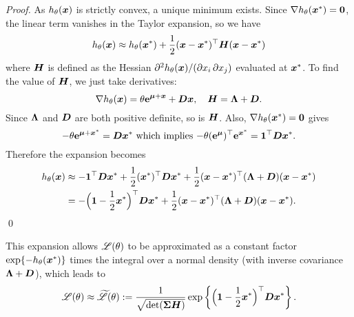 \begin{proof}
As $h_\theta(\bm{x})$ is strictly convex, a unique minimum exists. Since $\nabla
h_\theta(\bm{x}^*) = \bm{0}$, the linear term vanishes in the Taylor expansion,
so we have
%
\[ h_\theta(\bm{x}) \approx h_\theta(\bm{x}^*)
  + \frac12 (\bm{x} - \bm{x}^*)^\top \bm{H} (\bm{x} - \bm{x}^*) \]
%
where $\bm{H}$ is defined as the Hessian $\partial^2 h_\theta(\bm{x}) / ( \partial
x_i \, \partial x_j )$ evaluated at $\bm{x}^*$.  To find the value of $\bm{H}$, we
just take derivatives:
%
\[ \nabla h_\theta(\bm{x}) = \theta \text{\bf{e}}^{\bm{\mu} + \bm{x}} + \bm{D} \bm{x},
  \quad \bm{H} = \bm{\Lambda} + \bm{D}. \]
%
Since $\bm{\Lambda}$ and $\bm{D}$ are both positive definite, so is $\bm{H}$. Also,
$\nabla h_\theta(\bm{x}^*) = \bm{0}$ gives
\begin{equation} \label{grad_zero_subs}
    {-}\theta \text{\bf{e}}^{\bm{\mu} + \bm{x}^*} = \bm{D} \bm{x}^* \text{ which implies }
  {-}\theta (\text{\bf{e}}^{\bm{\mu}})^\top \text{\bf{e}}^{\bm{x}^*} = \bm{1}^\top \bm{D} \bm{x}^*.
\end{equation}
Therefore the expansion becomes
\begin{align*}
	h_\theta(\bm{x}) &\approx -\bm{1}^\top \bm{D} \bm{x}^*
 + \frac12 (\bm{x}^*)^\top \bm{D} \bm{x}^*
 + \frac12 (\bm{x} - \bm{x}^*)^\top (\bm{\Lambda} + \bm{D}) (\bm{x} - \bm{x}^*) \\
	&= - \Bigl(\bm{1} - \frac12 \bm{x}^* \Bigr)^\top \bm{D} \bm{x}^*
 + \frac12 (\bm{x} - \bm{x}^*)^\top (\bm{\Lambda} + \bm{D}) (\bm{x} - \bm{x}^*).
\end{align*}
\qed
\end{proof}

This expansion allows $\mathscr{L}(\theta)$ to be approximated as a constant
factor $\exp\{-h_\theta(\bm{x}^*)\}$ times the integral over a normal density
(with inverse covariance $\bm{\Lambda} + \bm{D}$), which leads to
\[
	\mathscr{L}(\theta) \approx \widetilde{\mathscr{L}}(\theta)
 := \frac{1}{\sqrt{\det(\bm{\Sigma} \bm{H})}}
  \exp\left\{ \Bigl(\bm{1} - \frac12 \bm{x}^* \Bigr)^\top \bm{D} \bm{x}^* \right\}.
\]

